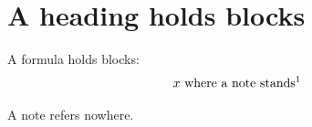 \flmHeading[toc=true]
\section{A heading holds blocks}{\flmLabels{}}

A formula holds blocks:
\begin{equation}
x \text{ where a note stands\flmXNfootnote{The formula's first paragraph.

The formula's second paragraph.}}
\end{equation}

A note refers nowhere.%
\RequirePackage{amsmath}
\RequirePackage{zref-clever}
\ProvideDocumentCommand{}
%
%

